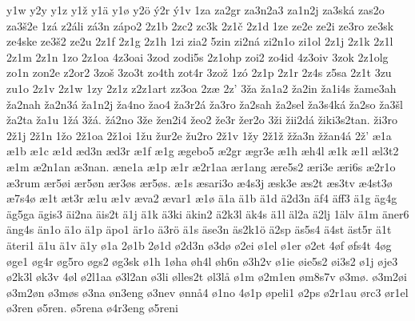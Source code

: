 {    y1w
    y2y
    y1z
    y1ž
    y1ä
    y1ø
    y2ö
    ý2r
    ý1v
    1za
    za2gr
    za3n2a3
    za1n2j
    za3ská
    zas2o
    za3š2e
    1zá
    z2áli
    zá3n
    zápo2
    2z1b
    2zc2
    zc3k
    2z1č
    2z1d
    1ze
    ze2e
    ze2i
    ze3ro
    ze3sk
    ze4ske
    ze3š2
    ze2u
    2z1f
    2z1g
    2z1h
    1zi
    zia2
    5zin
    zi2ná
    zi2n1o
    zi1ol
    2z1j
    2z1k
    2z1l
    2z1m
    2z1n
    1zo
    2z1oa
    4z3oai
    3zod
    zodi5s
    2z1ohp
    zoi2
    zo4id
    4z3oiv
    3zok
    2z1olg
    zo1n
    zon2e
    z2or2
    3zoš
    3zo3t
    zo4th
    zot4r
    3zož
    1zó
    2z1p
    2z1r
    2z4s
    z5sa
    2z1t
    3zu
    zu1o
    2z1v
    2z1w
    1zy
    2z1z
    z2z1art
    zz3oa
    2zæ
    2z'
    3ža
    ža1a2
    ža2in
    ža1i4s
    žame3ah
    ža2nah
    ža2n3á
    ža1n2j
    ža4no
    žao4
    ža3r2á
    ža3ro
    ža2sah
    ža2sel
    ža3s4ká
    ža2so
    ža3šl
    ža2ta
    ža1u
    1žá
    3žá.
    žá2no
    3že
    žen2i4
    žeo2
    že3r
    žer2o
    3ži
    žii2dá
    žiki3s2tan.
    ži3ro
    2ž1j
    2ž1n
    1žo
    2ž1oa
    2ž1oi
    1žu
    žur2e
    žu2ro
    2ž1v
    1žy
    2ž1ž
    žža3n
    žžan4á
    2ž'
    æ1a
    æ1b
    æ1c
    æ1d
    æd3n
    æd3r
    æ1f
    æ1g
    ægebo5
    æ2gr
    ægr3e
    æ1h
    æh4l
    æ1k
    æ1l
    æl3t2
    æ1m
    æ2n1an
    æ3nan.
    æne1a
    æ1p
    æ1r
    æ2r1aa
    ær1ang
    ære5s2
    æri3e
    æri6s
    æ2r1o
    æ3rum
    ær5øi
    ær5øn
    ær3øs
    ær5øs.
    æ1s
    æsari3o
    æ4s3j
    æsk3e
    æs2t
    æs3tv
    æ4st3ø
    æ7s4ø
    æ1t
    æt3r
    æ1u
    æ1v
    æva2
    ævar1
    æ1ø
    ä1a
    ä1b
    ä1d
    ä2d3n
    äf4
    äff3
    ä1g
    äg4g
    äg5ga
    ägis3
    äi2na
    äis2t
    ä1j
    ä1k
    ä3ki
    äkin2
    ä2k3l
    äk4s
    ä1l
    äl2a
    ä2lj
    1älv
    ä1m
    äner6
    äng4s
    än1o
    ä1o
    ä1p
    äpo1
    är1o
    ä3rö
    ä1s
    äse3n
    äs2k1ö
    ä2sp
    äs5s4
    ä4st
    äst5r
    ä1t
    äteri1
    ä1u
    ä1v
    ä1y
    ø1a
    2ø1b
    2ø1d
    ø2d3n
    ø3dø
    ø2ei
    ø1el
    ø1er
    ø2et
    4øf
    øfs4t
    4øg
    øge1
    øg4r
    øg5ro
    øgs2
    øg3sk
    ø1h
    1øha
    øh4l
    øh6n
    ø3h2v
    ø1ie
    øie5s2
    øi3s2
    ø1j
    øje3
    ø2k3l
    øk3v
    4øl
    ø2l1aa
    ø3l2an
    ø3li
    ølles2t
    øl3lå
    ø1m
    ø2m1en
    øm8s7v
    ø3mø.
    ø3m2øi
    ø3m2øn
    ø3møs
    ø3na
    øn3eng
    ø3nev
    ønnå4
    ø1no
    4ø1p
    øpeli1
    ø2ps
    ø2r1au
    ørc3
    ør1el
    ø3ren
    ø5ren.
    ø5rena
    ø4r3eng
    ø5reni
}
